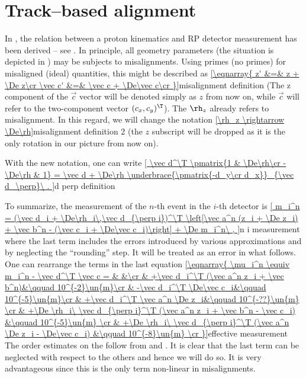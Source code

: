 
\section[al tb]{Track--based alignment}


In , the relation between a proton kinematics and RP detector measurement has been derived -- see . In principle, all geometry parameters (the situation is depicted in ) may be subjects to misalignments. Using primes (no primes) for misaligned (ideal) quantities, this might be described as
\eqref{\eqnarray{
z' &=& z + \De z\cr
\vec c' &=& \vec c + \De\vec c\cr
}}{misalignment definition}
(The z component of the $\vec c$ vector will be denoted simply as $z$ from now on, while $\vec c$ will refer to the two-component vector $(c_x, c_y)^\T$). The $\rh_z$ already refers to misalignment. In this regard, we will change the notation
\eqref{\rh_z \rightarrow \De\rh}{misalignment definition 2}
(the $z$ subscript will be dropped as it is the only rotation in our picture from now on).

With the new notation, one can write
\eqref{
\vec d^\T \pmatrix{1 & \De\rh\cr -\De\rh & 1} =
\vec d + \De\rh \underbrace{\pmatrix{-d_y\cr d_x}}_{\vec d_\perp}\ .
}{d perp definition}


To summarize, the measurement of the $n$-th event in the $i$-th detector is
\eqref{
m_i^n = (\vec d_i + \De\rh_i\,\vec d_{\perp i})^\T \left[\vec a^n (z_i + \De z_i) + \vec b^n - (\vec c_i + \De\vec c_i)\right] + \De m_i^n\ ,
}{n i measurement}
where the last term includes the errors introduced by various approximations and by neglecting the ``rounding'' step. It will be treated as an error in what follows. One can rearrange the terms in the last equation
\eqref{\eqnarray{
\mu_i^n \equiv m_i^n - \vec d^\T \vec c = & &\cr
& +\vec d_i^\T (\vec a^n z_i + \vec b^n)&\qquad 10^{-2}\un{m}\cr
& -\vec d_i^\T \De\vec c_i&\qquad 10^{-5}\un{m}\cr
& +\vec d_i^\T \vec a^n \De z_i&\qquad 10^{-??}\un{m} \cr
& +\De \rh_i\ \vec d_{\perp i}^\T (\vec a^n z_i + \vec b^n - \vec c_i) &\qquad 10^{-5}\un{m} \cr
& +\De \rh_i\ \vec d_{\perp i}^\T (\vec a^n \De z_i - \De\vec c_i) &\qquad 10^{-8}\un{m} \cr
}}{effective measurement}
The order estimates on the \rhs{} follow from  and . It is clear that the last term can be neglected with respect to the others and hence we will do so. It is very advantageous since this is the only term non-linear in misalignments. 

